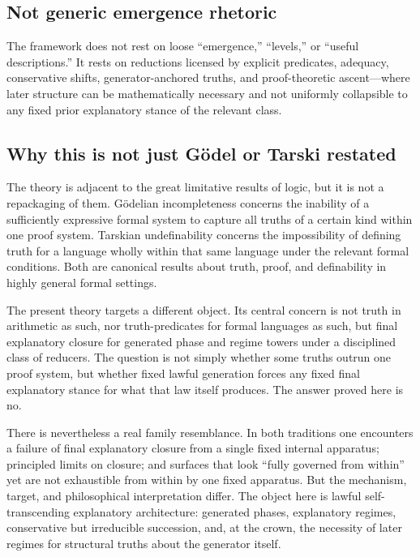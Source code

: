\documentclass[11pt,a4paper]{article}
\theoremstyle{definition}
\begin{document}
\subsection{Not generic emergence rhetoric}

The framework does not rest on loose ``emergence,'' ``levels,'' or ``useful descriptions.'' It rests on reductions licensed by explicit predicates, adequacy, conservative shifts, generator-anchored truths, and proof-theoretic ascent---where later structure can be mathematically necessary and not uniformly collapsible to any fixed prior explanatory stance of the relevant class.

\subsection{Why this is not just Gödel or Tarski restated}\label{sec:not-godel-tarski}

The theory is adjacent to the great limitative results of logic, but it is not a repackaging of them. Gödelian incompleteness \cite{Godel1931} concerns the inability of a sufficiently expressive formal system to capture all truths of a certain kind within one proof system. Tarskian undefinability \cite{Tarski1956} concerns the impossibility of defining truth for a language wholly within that same language under the relevant formal conditions. Both are canonical results about truth, proof, and definability in highly general formal settings.

The present theory targets a different object. Its central concern is not truth in arithmetic as such, nor truth-predicates for formal languages as such, but final explanatory closure for generated phase and regime towers under a disciplined class of reducers. The question is not simply whether some truths outrun one proof system, but whether fixed lawful generation forces any fixed final explanatory stance for what that law itself produces. The answer proved here is no.

There is nevertheless a real family resemblance. In both traditions one encounters a failure of final explanatory closure from a single fixed internal apparatus; principled limits on closure; and surfaces that look ``fully governed from within'' yet are not exhaustible from within by one fixed apparatus. But the mechanism, target, and philosophical interpretation differ. The object here is lawful self-transcending explanatory architecture: generated phases, explanatory regimes, conservative but irreducible succession, and, at the crown, the necessity of later regimes for structural truths about the generator itself.
\end{document}
